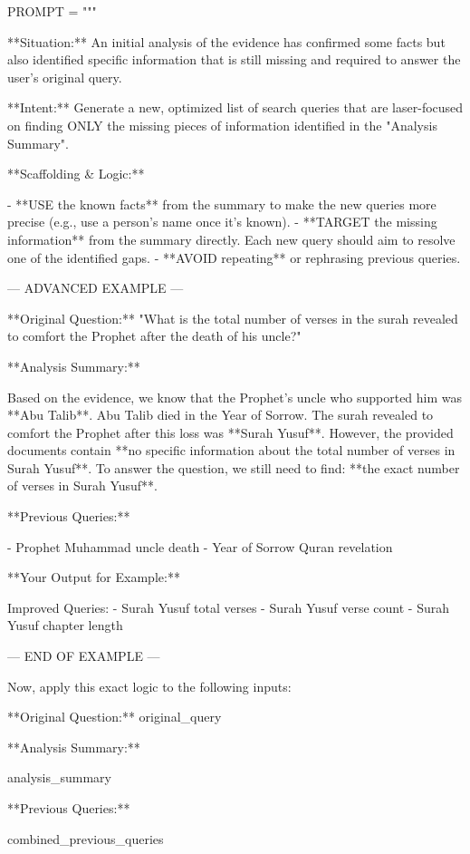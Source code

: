 \documentclass[11pt]{article}
\begin{document}
\begin{PromptBlock}
PROMPT = """

**Situation:** An initial analysis of the evidence has confirmed some facts but also identified specific information that is still missing and required to answer the user's original query.

**Intent:** Generate a new, optimized list of search queries that are laser-focused on finding ONLY the missing pieces of information identified in the "Analysis Summary".

**Scaffolding & Logic:**

- **USE the known facts** from the summary to make the new queries more precise (e.g., use a person's name once it's known).
- **TARGET the missing information** from the summary directly. Each new query should aim to resolve one of the identified gaps.
- **AVOID repeating** or rephrasing previous queries.

--- ADVANCED EXAMPLE ---

**Original Question:** "What is the total number of verses in the surah revealed to comfort the Prophet after the death of his uncle?"

**Analysis Summary:**

Based on the evidence, we know that the Prophet's uncle who supported him was **Abu Talib**. Abu Talib died in the Year of Sorrow. The surah revealed to comfort the Prophet after this loss was **Surah Yusuf**. However, the provided documents contain **no specific information about the total number of verses in Surah Yusuf**. To answer the question, we still need to find: **the exact number of verses in Surah Yusuf**.

**Previous Queries:**

- Prophet Muhammad uncle death
- Year of Sorrow Quran revelation

**Your Output for Example:**

Improved Queries:
- Surah Yusuf total verses
- Surah Yusuf verse count
- Surah Yusuf chapter length

--- END OF EXAMPLE ---

Now, apply this exact logic to the following inputs:

**Original Question:** {original_query}

**Analysis Summary:**

{analysis_summary}

**Previous Queries:**

{combined_previous_queries}


\end{PromptBlock}
\end{document}
